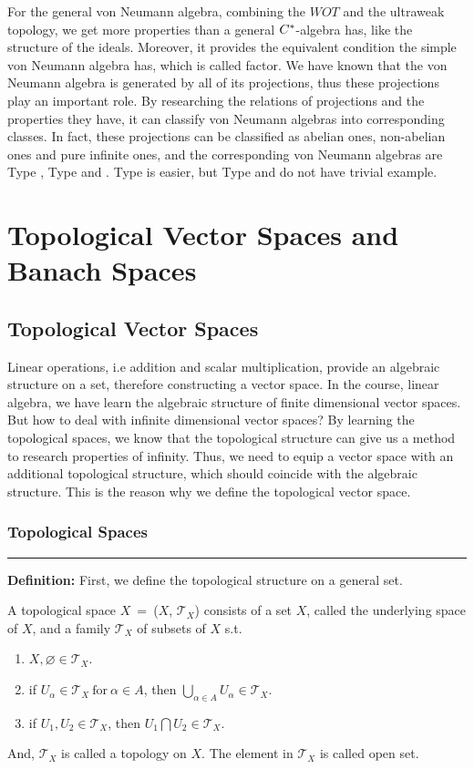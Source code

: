 \documentclass[a4paper,11pt]{report}
\begin{document}
For the general von Neumann algebra, combining the $WOT$ and the ultraweak topology, we get more properties than a general $C^{*}$-algebra has, like the structure of the ideals. Moreover, it provides the equivalent condition the simple von Neumann algebra has, which is called factor. We have known that the von Neumann algebra is generated by all of its projections, thus these projections play an important role. By researching the relations of projections and the properties they have, it can classify von Neumann algebras into corresponding classes. In fact, these projections can be classified as abelian ones, non-abelian ones and pure infinite ones, and the corresponding von Neumann algebras are Type , Type  and . Type  is easier, but Type  and  do not have trivial example.

\chapter{Topological Vector Spaces and Banach Spaces}

\section{Topological Vector Spaces}
Linear operations, i.e addition and scalar multiplication, provide an algebraic structure on a set, therefore constructing a vector space. In the course, linear algebra, we have learn the algebraic structure of finite dimensional vector spaces. But how to deal with infinite dimensional vector spaces? By learning the topological spaces, we know that the topological structure can give us a method to research properties of infinity. Thus, we need to equip a vector space with an additional topological structure, which should coincide with the algebraic structure. This is the reason why we define the topological vector space.

\subsection{Topological Spaces}
\rule{1mm}{1mm} \textbf{Definition:} First, we define the topological structure on a general set.
\begin{defn}
A topological space $X$~=~($X$, $\mathscr{T}_X$) consists of a set $X$, called the underlying space of $X$, and a family $\mathscr{T}_X$ of subsets of $X$ s.t.
	\begin{enumerate}[label=\arabic*)]
		\item $X, \varnothing \in \mathscr{T}_X$.
		\item if $U_\alpha \in \mathscr{T}_X \ \text{for} \ \alpha \in A$, then $\bigcup_{\alpha \in A}U_\alpha \in \mathscr{T}_X$.
		\item if $U_1, U_2 \in \mathscr{T}_X$, then $U_1 \bigcap U_2 \in \mathscr{T}_X$.
	\end{enumerate}
And, $\mathscr{T}_X$ is called a topology on $X$. The element in $\mathscr{T}_X$ is called open set.
\end{defn}
\end{document}
